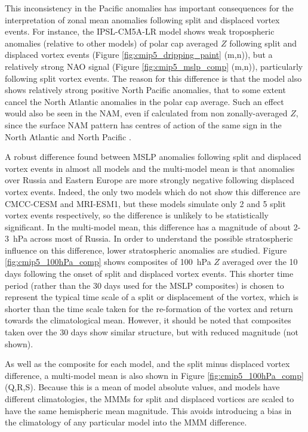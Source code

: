 This inconsistency in the Pacific anomalies has important consequences for the
interpretation of zonal mean anomalies following split and displaced vortex
events. For instance, the IPSL-CM5A-LR model shows weak tropospheric anomalies
(relative to other models) of polar cap averaged $Z$ following split and
displaced vortex events (Figure \ref{fig:cmip5_dripping_paint} (m,n)), but a
relatively strong NAO signal (Figure \ref{fig:cmip5_mslp_comp} (m,n)),
particularly following split vortex events. The reason for this difference is
that the model also shows relatively strong positive North Pacific anomalies,
that to some extent cancel the North Atlantic anomalies in the polar cap
average. Such an effect would also be seen in the NAM, even if calculated from
non zonally-averaged $Z$, since the surface NAM pattern has centres of action of
the same sign in the North Atlantic and North Pacific
\citep[e.g.,][]{Ambaum2001}.

A robust difference found between MSLP anomalies following split and displaced
vortex events in almost all models and the multi-model mean is that anomalies
over Russia and Eastern Europe are more strongly negative following displaced
vortex events. Indeed, the only two models which do not show this difference are
CMCC-CESM and MRI-ESM1, but these models simulate only 2 and 5 split vortex
events respectively, so the difference is unlikely to be statistically
significant. In the multi-model mean, this difference has a magnitude of about
2-3~hPa across most of Russia. In order to understand the possible stratospheric
influence on this difference, lower stratospheric anomalies are studied. Figure
\ref{fig:cmip5_100hPa_comp} shows composites of 100~hPa $Z$ averaged over the 10
days following the onset of split and displaced vortex events. This shorter time
period (rather than the 30 days used for the MSLP composites) is chosen to
represent the typical time scale of a split or displacement of the vortex, which
is shorter than the time scale taken for the re-formation of the vortex and
return towards the climatological mean. However, it should be noted that
composites taken over the 30 days show similar structure, but with reduced
magnitude (not shown).

As well as the composite for each model, and the split minus displaced vortex
difference, a multi-model mean is also shown in Figure
\ref{fig:cmip5_100hPa_comp} (Q,R,S). Because this is a mean of model absolute
values, and models have different climatologies, the MMMs for split and
displaced vortices are scaled to have the same hemispheric mean magnitude. This
avoids introducing a bias in the climatology of any particular model into the
MMM difference. 

